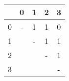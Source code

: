 \begin{tabular}{r|cccc}
	&	0	&	1	&	2	&	3	\\
\hline
0	&	-	&	1	&	1	&	0	\\
1	&		&	-	&	1	&	1	\\
2	&		&		&	-	&	1	\\
3	&		&		&		&	-	\\
\end{tabular}
